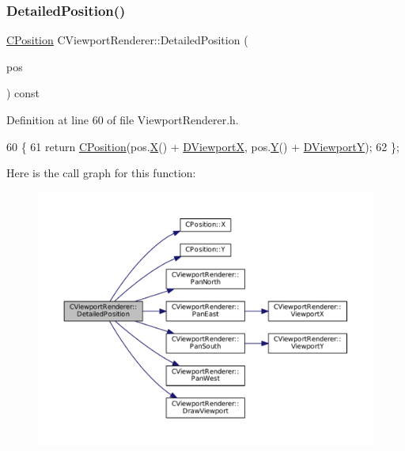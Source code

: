\subsubsection{\texorpdfstring{Detailed\+Position()}{DetailedPosition()}}
{\footnotesize\ttfamily \hyperlink{classCPosition}{C\+Position} C\+Viewport\+Renderer\+::\+Detailed\+Position (\begin{DoxyParamCaption}\item[{const \hyperlink{classCPosition}{C\+Position} \&}]{pos }\end{DoxyParamCaption}) const\hspace{0.3cm}{\ttfamily [inline]}}



Definition at line 60 of file Viewport\+Renderer.\+h.


\begin{DoxyCode}
60                                                               \{
61             \textcolor{keywordflow}{return} \hyperlink{classCPosition}{CPosition}(pos.\hyperlink{classCPosition_a9a6b94d3b91df1492d166d9964c865fc}{X}() + \hyperlink{classCViewportRenderer_aea9e05347f71a8e6b83439aab653be18}{DViewportX}, pos.\hyperlink{classCPosition_a1aa8a30e2f08dda1f797736ba8c13a87}{Y}() + 
      \hyperlink{classCViewportRenderer_ae13dd437a3da3d2bab16bc7ba61cb78f}{DViewportY});  
62         \};
\end{DoxyCode}
Here is the call graph for this function\+:
\nopagebreak
\begin{figure}[H]
\begin{center}
\leavevmode
\includegraphics[width=350pt]{classCViewportRenderer_a2c23b54725686c6219c8765e48351d72_cgraph}
\end{center}
\end{figure}
\hypertarget{classCViewportRenderer_ad5cf67fd6d4d69f861dbc0b773cdcab2}{}\label{classCViewportRenderer_ad5cf67fd6d4d69f861dbc0b773cdcab2} 
